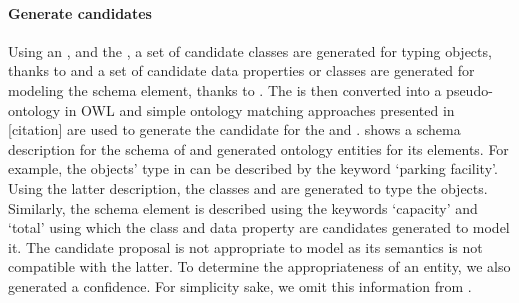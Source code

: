 \paragraph{Generate candidates}
Using an , and the , a set of candidate classes are generated for typing objects, thanks to  and a set of candidate data properties or classes are generated for modeling the schema element, thanks to .
The  is then converted into a pseudo-ontology in OWL and simple ontology matching approaches presented in [citation] are used to generate the candidate for the  and .
 shows a schema description for the schema of  and generated ontology entities for its elements. For example, the objects' type in  can be described by the keyword `parking facility'. Using the latter description, the classes  and  are generated to type the objects. Similarly, the schema element  is described using the keywords `capacity' and `total' using which the class  and data property  are candidates generated to model it. The candidate proposal  is not appropriate to model  as its semantics is not compatible with the latter. To determine the appropriateness of an entity, we also generated a confidence. For simplicity sake, we omit this information from .

